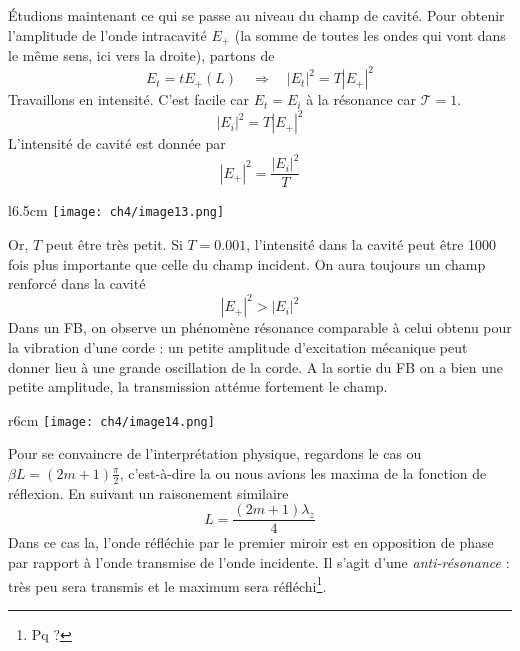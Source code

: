 Étudions maintenant ce qui se passe au niveau du champ de cavité. Pour obtenir l'amplitude de l'onde 
intracavité $E_+$ (la somme de toutes les ondes qui vont dans le même sens, ici vers la droite), partons de 
\begin{equation}
E_t = t E_+(L)\quad\Rightarrow\quad|E_t|^2 = T|E_+|^2
\end{equation}
Travaillons en intensité. C'est facile car $E_t=E_i$ à la résonance car $\mathcal{T}=1$.
\begin{equation}
|E_i|^2 = T|E_+|^2
\end{equation}
L'intensité de cavité est donnée par 
\begin{equation}
|E_+|^2 = \frac{|E_i|^2}{T}
\end{equation}

	\begin{wrapfigure}[11]{l}{6.5cm}
	\vspace{-15mm}
	\texttt{[image: ch4/image13.png]}
	\end{wrapfigure}
Or, $T$ peut être très petit. Si $T=0.001$, l'intensité dans la cavité peut être 1000 fois plus 
importante que celle du champ incident. On aura toujours un champ renforcé dans la cavité
\begin{equation}
|E_+|^2> |E_i|^2
\end{equation}
Dans un FB, on observe un phénomène résonance comparable à celui obtenu pour la vibration d'une 
corde : un petite amplitude d'excitation mécanique peut donner lieu à une grande oscillation de 
la corde. A la sortie du FB on a bien une petite amplitude, la transmission atténue fortement le 
champ.\\


	\begin{wrapfigure}[11]{r}{6cm}
	\vspace{-5mm}
	\texttt{[image: ch4/image14.png]}
	\end{wrapfigure}
Pour se convaincre de l'interprétation physique, regardons le cas ou $\beta L = (2m+1)\frac{\pi}{
2}$, c'est-à-dire la ou nous avions les maxima de la fonction de réflexion. En suivant un raisonement 
similaire
\begin{equation}
L = \frac{(2m+1)\lambda_z}{4}
\end{equation}
Dans ce cas la, l'onde réfléchie par le premier miroir est en opposition de phase par rapport à l'onde 
transmise de l'onde incidente. Il s'agit d'une \textit{anti-résonance} : très peu sera transmis et le 
maximum sera réfléchi\footnote{Pq ?}.



